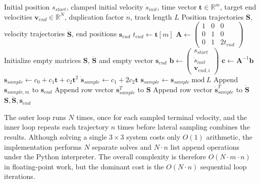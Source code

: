 \begin{algorithm}[ht!]
\caption{Original Longitudinal Sampling}
\label{alg:orig-long-sampling}
\begin{algorithmic}[1]
\Require Initial position $s_{start}$, clamped initial velocity $\dot{s}_{init}$, time vector $\mathbf{t} \in \mathbb{R}^{m}$, target end velocities $\mathbf{v}_{end} \in \mathbb{R}^{N}$, duplication factor $n$, track length $L$
\Ensure Position trajectories $\mathbf{S}$, velocity trajectories $\dot{\mathbf{S}}$, end positions $\mathbf{s}_{end}$
\State $t_{end} \gets \mathbf{t}[m]$ 
\State $\mathbf{A} \gets \begin{pmatrix} 1 & 0 & 0 \\ 0 & 1 & 0 \\ 0 & 1 & 2 t_{end} \end{pmatrix}$
\State Initialize empty matrices $\mathbf{S}$, $\dot{\mathbf{S}}$ and empty vector $\mathbf{s}_{end}$
    \State $\mathbf{b} \gets \begin{pmatrix} s_{start} \\ \dot{s}_{init} \\ \mathbf{v}_{end, i} \end{pmatrix}$
    \State $\mathbf{c} \gets \mathbf{A}^{-1} \mathbf{b}$ 
    \State $\mathbf{s}_{sample} \gets c_0 + c_1 \mathbf{t} + c_2 \mathbf{t}^2$ 
    \State $\dot{\mathbf{s}}_{sample} \gets c_1 + 2 c_2 \mathbf{t}$
    \State $\mathbf{s}_{sample} \gets \mathbf{s}_{sample} \ \text{mod} \ L$ 
    \State Append $\mathbf{s}_{sample, m}$ to $\mathbf{s}_{end}$ 
     
        \State Append row vector $\mathbf{s}_{sample}^T$ to $\mathbf{S}$
        \State Append row vector $\dot{\mathbf{s}}_{sample}^T$ to $\dot{\mathbf{S}}$
    \EndFor
\EndFor
\State \Return $\mathbf{S}, \dot{\mathbf{S}}, \mathbf{s}_{end}$
\end{algorithmic}
\end{algorithm}

\newpage
\vspace{-0.5cm}
The outer loop runs $N$ times, once for each sampled terminal velocity, and the inner loop repeats each trajectory $n$ times before lateral sampling combines the results.
Although solving a single $3 \times 3$ system costs only $O(1)$ arithmetic, the implementation performs $N$ separate solves and $N \cdot n$ list append operations under the Python interpreter.
The overall complexity is therefore $O(N \cdot m \cdot n)$ in floating-point work, but the dominant cost is the $O(N \cdot n)$ sequential loop iterations.

